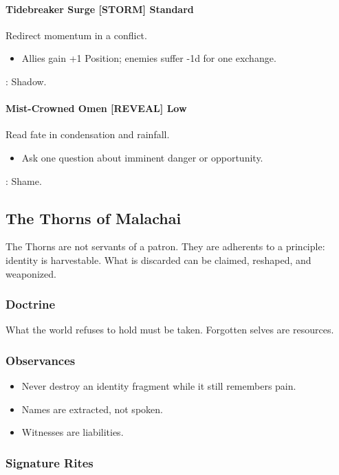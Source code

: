 \paragraph{Tidebreaker Surge \hfill \textnormal{[STORM] Standard}}
Redirect momentum in a conflict.
\begin{itemize}
  \item Allies gain +1 Position; enemies suffer -1d for one exchange.
\end{itemize}
: Shadow.

\paragraph{Mist-Crowned Omen \hfill \textnormal{[REVEAL] Low}}
Read fate in condensation and rainfall.
\begin{itemize}
  \item Ask one question about imminent danger or opportunity.
\end{itemize}
: Shame.

\subsection{The Thorns of Malachai}
The Thorns are not servants of a patron. They are adherents to a principle: identity is harvestable. What is discarded can be claimed, reshaped, and weaponized.

\subsubsection*{Doctrine}
What the world refuses to hold must be taken. Forgotten selves are resources.

\subsubsection*{Observances}
\begin{itemize}
  \item Never destroy an identity fragment while it still remembers pain.
  \item Names are extracted, not spoken.
  \item Witnesses are liabilities.
\end{itemize}

\subsubsection*{Signature Rites}

